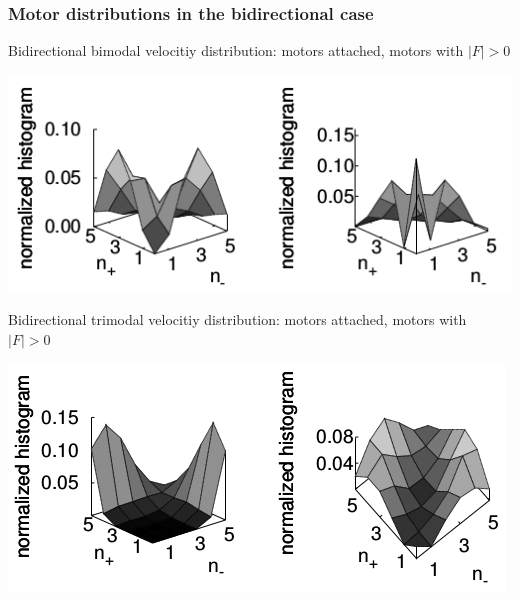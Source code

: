 \documentclass[11pt]{beamer}
\begin{document}
\begin{frame}
 \frametitle{Motor distributions in the bidirectional case}
 \centering
 \begin{footnotesize}
  Bidirectional bimodal velocitiy distribution: motors attached, motors with $|F| > 0$
 \end{footnotesize}
  \includegraphics[scale=.5]{img/bidi-bimodal-mdist.png} \\
 \begin{footnotesize}
  Bidirectional trimodal velocitiy distribution: motors attached, motors with $|F| > 0$
 \end{footnotesize}
  \includegraphics[scale=.5]{img/bidi-trimodal-mdist.png} 
\end{frame}
\end{document}
